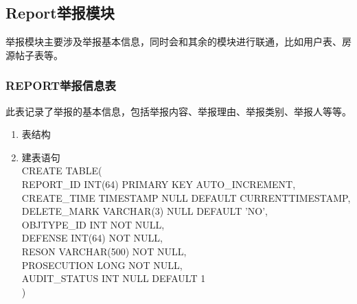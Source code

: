 \subsection{Report举报模块}
举报模块主要涉及举报基本信息，同时会和其余的模块进行联通，比如用户表、房源帖子表等。
\subsubsection{REPORT举报信息表}
此表记录了举报的基本信息，包括举报内容、举报理由、举报类别、举报人等等。
\begin{enumerate}
    \item 表结构
    \begin{table}[htbp]
        \centering
        \end{table}
    \item 建表语句\\
        CREATE TABLE(\\
            REPORT\_ID INT(64) PRIMARY KEY AUTO\_INCREMENT,\\
            CREATE\_TIME TIMESTAMP NULL DEFAULT CURRENTTIMESTAMP,\\
            DELETE\_MARK VARCHAR(3) NULL DEFAULT 'NO',\\
            OBJTYPE\_ID INT NOT NULL,\\
            DEFENSE INT(64) NOT NULL,\\
            RESON VARCHAR(500) NOT NULL,\\
            PROSECUTION LONG NOT NULL,\\
            AUDIT\_STATUS INT NULL DEFAULT 1\\
        )
    \end{enumerate}

